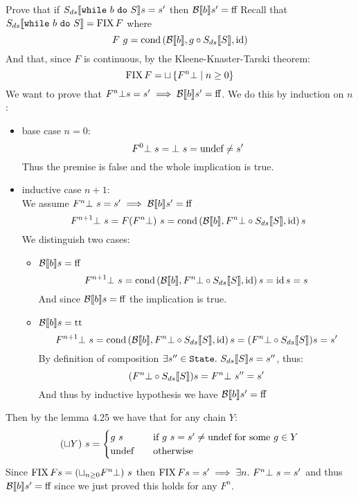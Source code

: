 \begin{exercise}{
    Prove that if $S_{ds} \llbracket \texttt{while}\ b\ \texttt{do}\ S \rrbracket s = s'$ then $\mathcal{B} \llbracket b \rrbracket s' = \text{ff}$
}
    Recall that $S_{ds} \llbracket \texttt{while}\ b\ \texttt{do}\ S \rrbracket = \operatorname{FIX} F$ where
    \[ F\ g= \operatorname{cond}\left(\mathcal{B} \llbracket b \rrbracket, g \circ S_{ds} \llbracket S \rrbracket, \operatorname{id}\right) \]
    And that, since $F$ is continuous, by the Kleene-Knaster-Tarski theorem:
    \[ \operatorname{FIX}{F} = \sqcup \left\{ F^n \bot \mid n \geq 0 \right\} \]
    We want to prove that $F^n \bot s = s' \implies \mathcal{B} \llbracket b \rrbracket s' = \text{ff}$. We do this by induction on $n$:
    \begin{itemize}
        \item base case $n = 0$:
            \[ F^0 \bot\ s = \bot\ s = \text{undef} \neq s' \]
            Thus the premise is false and the whole implication is true.
        \item inductive case $n + 1$: \\
            We assume $F^n \bot\ s = s' \implies \mathcal{B} \llbracket b \rrbracket s' = \text{ff}$
            \[ F^{n+1} \bot\ s = F(F^n \bot)\ s = \operatorname{cond}\left(\mathcal{B} \llbracket b \rrbracket, F^n \bot \circ S_{ds} \llbracket S \rrbracket, \operatorname{id}\right) s \]
            We distinguish two cases:
            \begin{itemize}
                \item $\mathcal{B} \llbracket b \rrbracket s = \text{ff}$
                    \[ F^{n+1} \bot\ s = \operatorname{cond}\left(\mathcal{B} \llbracket b \rrbracket, F^n \bot \circ S_{ds} \llbracket S \rrbracket, \operatorname{id}\right) s = \operatorname{id} s = s \]
                    And since $\mathcal{B} \llbracket b \rrbracket s = \text{ff}$ the implication is true.
                \item $\mathcal{B} \llbracket b \rrbracket s = \text{tt}$
                    \[ F^{n+1} \bot\ s = \operatorname{cond}\left(\mathcal{B} \llbracket b \rrbracket, F^n \bot \circ S_{ds} \llbracket S \rrbracket, \operatorname{id}\right) s = (F^n \bot \circ S_{ds} \llbracket S \rrbracket) s = s' \]
                    By definition of composition $\exists s'' \in \State.\ \Sds{S} s = s''$, thus:
                    \[ (F^n \bot \circ S_{ds} \llbracket S \rrbracket) s = F^n \bot\ s'' = s' \]
                    And thus by inductive hypothesis we have $\mathcal{B} \llbracket b \rrbracket s' = \text{ff}$
            \end{itemize}
    \end{itemize}
    Then by the lemma 4.25 we have that for any chain $Y$:
    \[ (\sqcup Y)\ s = \begin{cases}
        g\ s &\quad \text{if } g\ s = s' \neq \text{undef} \text{ for some } g \in Y \\
        \text{undef} &\quad \text{otherwise}
    \end{cases} \]
    Since $\operatorname{FIX}{F} s = (\sqcup_{n \geq 0} F^n \bot)\ s$ then $\operatorname{FIX}{F} s = s' \implies \exists n.\ F^n \bot\ s = s'$ and thus $\mathcal{B} \llbracket b \rrbracket s' = \text{ff}$ since we just proved this holds for any $F^n$.
\end{exercise}
